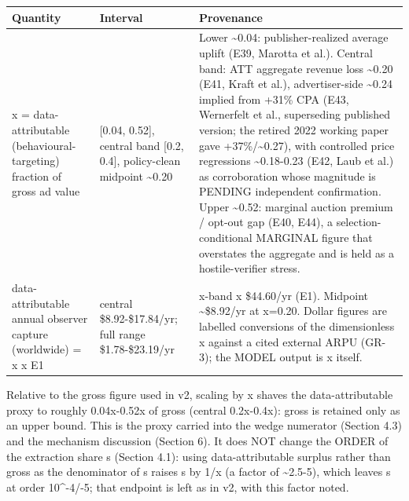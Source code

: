 \documentclass[
  11pt,
]{article}
\newcounter{none} %
\begin{document}
{\def\LTcaptype{none} %
\begin{longtable}[]{@{}
  >{\raggedright\arraybackslash}p{}
  >{\raggedright\arraybackslash}p{}
  >{\raggedright\arraybackslash}p{}@{}}
\toprule\noalign{}
\begin{minipage}[b]{\linewidth}\raggedright
Quantity
\end{minipage} & \begin{minipage}[b]{\linewidth}\raggedright
Interval
\end{minipage} & \begin{minipage}[b]{\linewidth}\raggedright
Provenance
\end{minipage} \\
\midrule\noalign{}
\endhead
\bottomrule\noalign{}
\endlastfoot
x = data-attributable (behavioural-targeting) fraction of gross ad value
& {[}0.04, 0.52{]}, central band {[}0.2, 0.4{]}, policy-clean midpoint
\textasciitilde0.20 & Lower \textasciitilde0.04: publisher-realized
average uplift (E39, Marotta et al.). Central band: ATT aggregate
revenue loss \textasciitilde0.20 (E41, Kraft et al.), advertiser-side
\textasciitilde0.24 implied from +31\% CPA (E43, Wernerfelt et al.,
superseding published version; the retired 2022 working paper gave
+37\%/\textasciitilde0.27), with controlled price regressions
\textasciitilde0.18-0.23 (E42, Laub et al.) as corroboration whose
magnitude is PENDING independent confirmation. Upper
\textasciitilde0.52: marginal auction premium / opt-out gap (E40, E44),
a selection-conditional MARGINAL figure that overstates the aggregate
and is held as a hostile-verifier stress. \\
data-attributable annual observer capture (worldwide) = x x E1 & central
\$8.92-\$17.84/yr; full range \$1.78-\$23.19/yr & x-band x \$44.60/yr
(E1). Midpoint \textasciitilde\$8.92/yr at x=0.20. Dollar figures are
labelled conversions of the dimensionless x against a cited external
ARPU (GR-3); the MODEL output is x itself. \\
\end{longtable}
}

Relative to the gross figure used in v2, scaling by x shaves the
data-attributable proxy to roughly 0.04x-0.52x of gross (central
0.2x-0.4x): gross is retained only as an upper bound. This is the proxy
carried into the wedge numerator (Section 4.3) and the mechanism
discussion (Section 6). It does NOT change the ORDER of the extraction
share s (Section 4.1): using data-attributable surplus rather than gross
as the denominator of s raises s by 1/x (a factor of
\textasciitilde2.5-5), which leaves s at order 10\^{}-4/-5; that
endpoint is left as in v2, with this factor noted.
\end{document}
